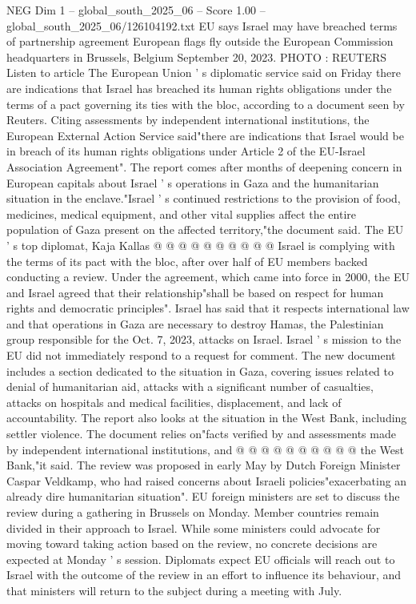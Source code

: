 \begin{textsample}{NEG Dim 1 – global\_south\_2025\_06 – Score 1.00 – global\_south\_2025\_06/126104192.txt}  \label{ex:f1_neg_246}
EU says Israel may have breached terms of partnership agreement European flags fly outside the European Commission headquarters in Brussels, Belgium September 20, 2023.
PHOTO : REUTERS Listen to article The European Union ' s diplomatic service said on Friday there are indications that Israel has breached its human rights obligations under the terms of a pact governing its ties with the bloc, according to a document seen by Reuters.
Citing assessments by independent international institutions, the European External Action Service said"there are indications that Israel would be in breach of its human rights obligations under Article 2 of the EU-Israel Association Agreement".
The report comes after months of deepening concern in European capitals about Israel ' s operations in Gaza and the humanitarian situation in the enclave."Israel ' s continued restrictions to the provision of food, medicines, medical equipment, and other vital supplies affect the entire population of Gaza present on the affected territory,"the document said.
The EU ' s top diplomat, Kaja Kallas @ @ @ @ @ @ @ @ @ @ Israel is complying with the terms of its pact with the bloc, after over half of EU members backed conducting a review.
Under the agreement, which came into force in 2000, the EU and Israel agreed that their relationship"shall be based on respect for human rights and democratic principles".
Israel has said that it respects international law and that operations in Gaza are necessary to destroy Hamas, the Palestinian group responsible for the Oct. 7, 2023, attacks on Israel.
Israel ' s mission to the EU did not immediately respond to a request for comment.
The new document includes a section dedicated to the situation in Gaza, covering issues related to denial of humanitarian aid, attacks with a significant number of casualties, attacks on hospitals and medical facilities, displacement, and lack of accountability.
The report also looks at the situation in the West Bank, including settler violence.
The document relies on"facts verified by and assessments made by independent international institutions, and @ @ @ @ @ @ @ @ @ @ the West Bank,"it said.
The review was proposed in early May by Dutch Foreign Minister Caspar Veldkamp, who had raised concerns about Israeli policies"exacerbating an already dire humanitarian situation".
EU foreign ministers are set to discuss the review during a gathering in Brussels on Monday.
Member countries remain divided in their approach to Israel.
While some ministers could advocate for moving toward taking action based on the review, no concrete decisions are expected at Monday ' s session.
Diplomats expect EU officials will reach out to Israel with the outcome of the review in an effort to influence its behaviour, and that ministers will return to the subject during a meeting with July.

\end{textsample}
